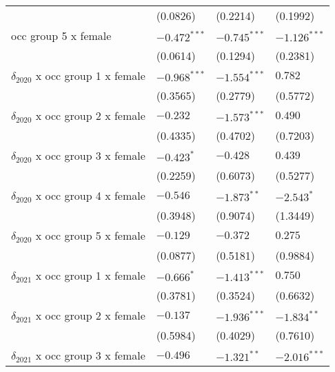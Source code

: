 \begin{tabular}{llll}
                                       &           (0.0826) &           (0.2214) &           (0.1992) \\
occ group 5 x female                   &     $-0.472^{***}$ &     $-0.745^{***}$ &     $-1.126^{***}$ \\
                                       &           (0.0614) &           (0.1294) &           (0.2381) \\
$\delta_{2020}$ x occ group 1 x female &     $-0.968^{***}$ &     $-1.554^{***}$ &            $0.782$ \\
                                       &           (0.3565) &           (0.2779) &           (0.5772) \\
$\delta_{2020}$ x occ group 2 x female &           $-0.232$ &     $-1.573^{***}$ &            $0.490$ \\
                                       &           (0.4335) &           (0.4702) &           (0.7203) \\
$\delta_{2020}$ x occ group 3 x female &         $-0.423^*$ &           $-0.428$ &            $0.439$ \\
                                       &           (0.2259) &           (0.6073) &           (0.5277) \\
$\delta_{2020}$ x occ group 4 x female &           $-0.546$ &      $-1.873^{**}$ &         $-2.543^*$ \\
                                       &           (0.3948) &           (0.9074) &           (1.3449) \\
$\delta_{2020}$ x occ group 5 x female &           $-0.129$ &           $-0.372$ &            $0.275$ \\
                                       &           (0.0877) &           (0.5181) &           (0.9884) \\
$\delta_{2021}$ x occ group 1 x female &         $-0.666^*$ &     $-1.413^{***}$ &            $0.750$ \\
                                       &           (0.3781) &           (0.3524) &           (0.6632) \\
$\delta_{2021}$ x occ group 2 x female &           $-0.137$ &     $-1.936^{***}$ &      $-1.834^{**}$ \\
                                       &           (0.5984) &           (0.4029) &           (0.7610) \\
$\delta_{2021}$ x occ group 3 x female &           $-0.496$ &      $-1.321^{**}$ &     $-2.016^{***}$ \\

\end{tabular}
